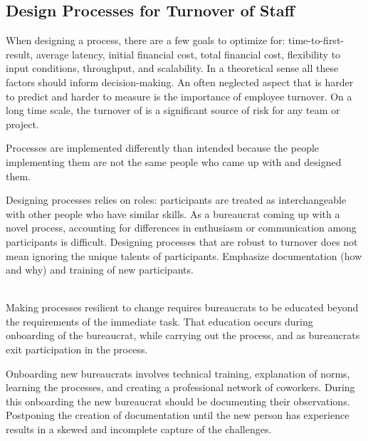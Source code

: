 \subsection*{Design Processes for Turnover of Staff\label{sec:turnover}}


When designing a \gls{process}, there are a few goals to optimize for: time-to-first-result, average latency, initial financial cost, total financial cost, flexibility to input conditions, throughput, and scalability. In a theoretical sense all these factors should inform decision-making. An often neglected aspect that is harder to predict and harder to measure is the importance of employee turnover. 
On a long time scale, the turnover of \iftoggle{glossarysubstitutionworks}{\glspl{bureaucrat}}{bureaucrats} is 
a significant source of risk for any team or project. 

Processes are implemented differently than intended because the people implementing them are not the same people who came up with and designed them.

Designing processes relies on roles: participants are treated as interchangeable with other people who have similar skills. As a bureaucrat coming up with a novel process, accounting for differences in enthusiasm or communication among participants is difficult. 
Designing processes that are robust to turnover does not mean ignoring the unique talents of participants. 
Emphasize documentation (how and why) and training of new participants. 



\ \\

Making processes resilient to change requires  bureaucrats to be educated beyond the requirements of the immediate task. That education occurs during onboarding of the bureaucrat, while carrying out the process, and as bureaucrats exit participation in the process. 

Onboarding new bureaucrats involves technical training, explanation of norms, learning the processes, and creating a professional network of coworkers. During this onboarding the new bureaucrat should be documenting their observations. Postponing the creation of documentation until the new person has experience results in a skewed and incomplete capture of the challenges.

